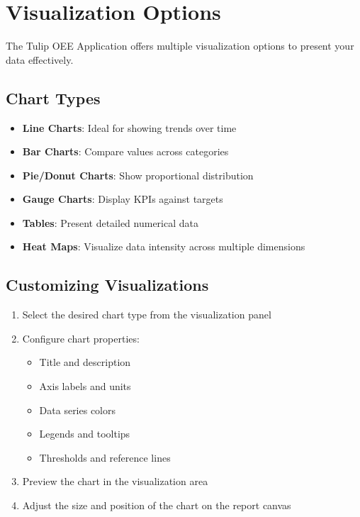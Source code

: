 \documentclass[12pt,a4paper]{report}
\begin{document}
\section{Visualization Options}

The Tulip OEE Application offers multiple visualization options to present your data effectively.

\subsection{Chart Types}

\begin{itemize}
    \item \textbf{Line Charts}: Ideal for showing trends over time
    \item \textbf{Bar Charts}: Compare values across categories
    \item \textbf{Pie/Donut Charts}: Show proportional distribution
    \item \textbf{Gauge Charts}: Display KPIs against targets
    \item \textbf{Tables}: Present detailed numerical data
    \item \textbf{Heat Maps}: Visualize data intensity across multiple dimensions
\end{itemize}

\subsection{Customizing Visualizations}

\begin{enumerate}
    \item Select the desired chart type from the visualization panel
    \item Configure chart properties:
    \begin{itemize}
        \item Title and description
        \item Axis labels and units
        \item Data series colors
        \item Legends and tooltips
        \item Thresholds and reference lines
    \end{itemize}
    \item Preview the chart in the visualization area
    \item Adjust the size and position of the chart on the report canvas
\end{enumerate}
\end{document}
